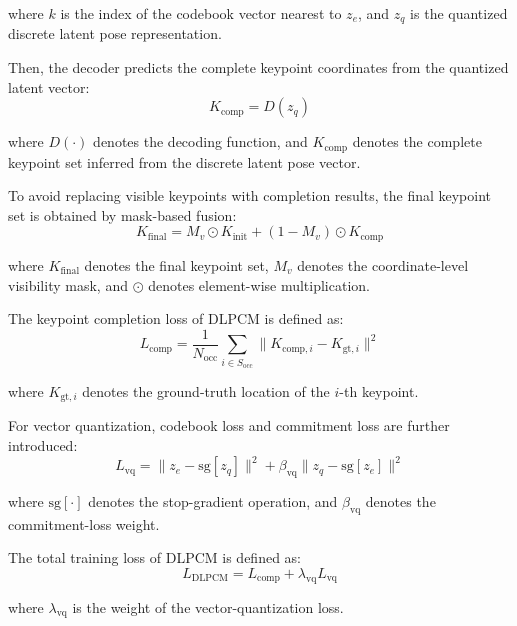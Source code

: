 \documentclass[runningheads]{llncs}
\begin{document}
where $k$ is the index of the codebook vector nearest to $z_e$, and $z_q$ is the quantized discrete latent pose representation.

Then, the decoder predicts the complete keypoint coordinates from the quantized latent vector:
\begin{equation}
K_{\text{comp}} = D(z_q)
\label{eq:decoder}
\end{equation}

where $D(\cdot)$ denotes the decoding function, and $K_{\text{comp}}$ denotes the complete keypoint set inferred from the discrete latent pose vector.

To avoid replacing visible keypoints with completion results, the final keypoint set is obtained by mask-based fusion:
\begin{equation}
K_{\text{final}} = M_v \odot K_{\text{init}} + (1 - M_v) \odot K_{\text{comp}}
\label{eq:fusion}
\end{equation}

where $K_{\text{final}}$ denotes the final keypoint set, $M_v$ denotes the coordinate-level visibility mask, and $\odot$ denotes element-wise multiplication.

The keypoint completion loss of DLPCM is defined as:
\begin{equation}
L_{\text{comp}} = \frac{1}{N_{\text{occ}}} \sum_{i \in S_{\text{occ}}} \|K_{\text{comp},i} - K_{\text{gt},i}\|^2
\label{eq:comp_loss}
\end{equation}

where $K_{\text{gt},i}$ denotes the ground-truth location of the $i$-th keypoint.

For vector quantization, codebook loss and commitment loss are further introduced:
\begin{equation}
L_{\text{vq}} = \|z_e - \text{sg}[z_q]\|^2 + \beta_{\text{vq}} \|z_q - \text{sg}[z_e]\|^2
\label{eq:vq_loss}
\end{equation}

where $\text{sg}[\cdot]$ denotes the stop-gradient operation, and $\beta_{\text{vq}}$ denotes the commitment-loss weight.

The total training loss of DLPCM is defined as:
\begin{equation}
L_{\text{DLPCM}} = L_{\text{comp}} + \lambda_{\text{vq}} L_{\text{vq}}
\label{eq:dlpcm_loss}
\end{equation}

where $\lambda_{\text{vq}}$ is the weight of the vector-quantization loss.
\end{document}
